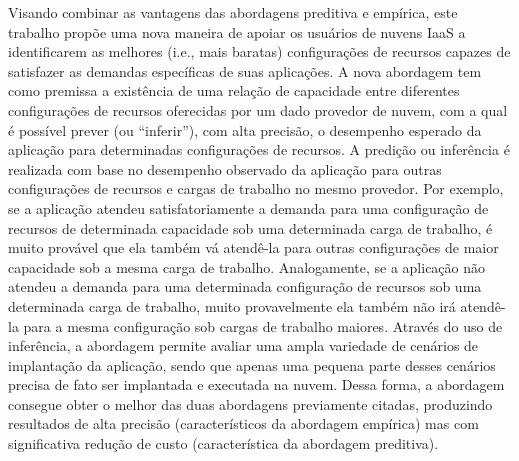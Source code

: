\documentclass[10pt,conference,compsocconf]{IEEEtran}
\begin{document}

Visando combinar as vantagens das abordagens preditiva e empírica, este trabalho propõe uma nova maneira de apoiar os usuários de nuvens IaaS a identificarem as melhores (i.e., mais baratas) configurações de recursos capazes de satisfazer as demandas específicas de suas aplicações. A nova abordagem tem como premissa a existência de uma relação de capacidade entre diferentes configurações de recursos oferecidas por um dado provedor de nuvem, 
com a qual é possível prever (ou ``inferir''), com alta precisão, o desempenho esperado da aplicação para determinadas configurações de recursos. A predição ou inferência é realizada com base no desempenho observado da aplicação para outras configurações de recursos e cargas de trabalho no mesmo provedor. Por exemplo, se a aplicação atendeu satisfatoriamente a demanda para uma configuração de recursos de determinada capacidade sob uma determinada carga de trabalho, é muito provável que ela também vá atendê-la para outras configurações de maior capacidade sob a mesma carga de trabalho. Analogamente, se a aplicação não atendeu a demanda para uma determinada configuração de recursos sob uma determinada carga de trabalho, muito provavelmente ela também não irá atendê-la para a mesma configuração sob cargas de trabalho maiores. Através do uso de inferência, a abordagem permite avaliar uma ampla variedade de cenários de implantação da aplicação, sendo que apenas uma pequena parte desses cenários precisa de fato ser implantada e executada na nuvem. Dessa forma, a abordagem consegue obter o melhor das duas abordagens previamente citadas, produzindo resultados de alta precisão (característicos da abordagem empírica) mas com significativa redução de custo (característica da abordagem preditiva).
\end{document}
